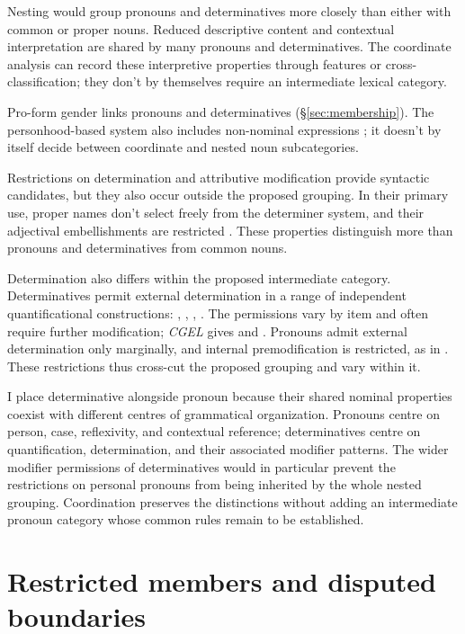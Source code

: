 \documentclass[12pt]{article}
\begin{document}
Nesting would group pronouns and determinatives more closely than either with common or proper nouns. Reduced descriptive content and contextual interpretation are shared by many pronouns and determinatives. The coordinate analysis can record these interpretive properties through features or cross-classification; they don't by themselves require an intermediate lexical category.

Pro-form gender links pronouns and determinatives (§\ref{sec:membership}). The personhood-based system also includes non-nominal expressions \citep{reynolds2025proformgender}; it doesn't by itself decide between coordinate and nested noun subcategories.

Restrictions on determination and attributive modification provide syntactic candidates, but they also occur outside the proposed grouping. In their primary use, proper names don't select freely from the determiner system, and their adjectival embellishments are restricted \citep[517, 519--520]{huddleston2002}. These properties distinguish more than pronouns and determinatives from common nouns.

Determination also differs within the proposed intermediate category. Determinatives permit external determination in a range of independent quantificational constructions: , , , . The permissions vary by item and often require further modification; \textit{CGEL} gives  and  \citep[415--416]{huddleston2002}. Pronouns admit external determination only marginally, and internal premodification is restricted, as in  \citep[429--430]{huddleston2002}. These restrictions thus cross-cut the proposed grouping and vary within it.

I place determinative alongside pronoun because their shared nominal properties coexist with different centres of grammatical organization. Pronouns centre on person, case, reflexivity, and contextual reference; determinatives centre on quantification, determination, and their associated modifier patterns. The wider modifier permissions of determinatives would in particular prevent the restrictions on personal pronouns from being inherited by the whole nested grouping. Coordination preserves the distinctions without adding an intermediate pronoun category whose common rules remain to be established.

\section{Restricted members and disputed boundaries}\label{sec:articles}
\end{document}
